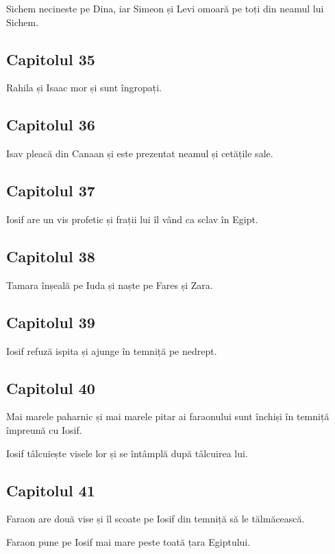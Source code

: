 \documentclass[12pt,a4paper]{article}
\begin{document}
Sichem necineste pe Dina, iar Simeon și Levi omoară pe toți din neamul lui Sichem.

\subsection{Capitolul 35}

Rahila și Isaac mor și sunt îngropați.

\subsection{Capitolul 36}

Isav pleacă din Canaan și este prezentat neamul și cetățile sale.

\subsection{Capitolul 37}

Iosif are un vis profetic și frații lui îl vând ca sclav în Egipt.

\subsection{Capitolul 38}

Tamara înșeală pe Iuda și naște pe Fares și Zara.

\subsection{Capitolul 39}

Iosif refuză ispita și ajunge în temniță pe nedrept.

\subsection{Capitolul 40}

Mai marele paharnic și mai marele pitar ai faraonului sunt închiși în temniță împreună cu Iosif.

Iosif tâlcuiește visele lor și se întâmplă după tâlcuirea lui.

\subsection{Capitolul 41}

Faraon are două vise și îl scoate pe Iosif din temniță să le tălmăcească.

Faraon pune pe Iosif mai mare peste toată țara Egiptului.
\end{document}

